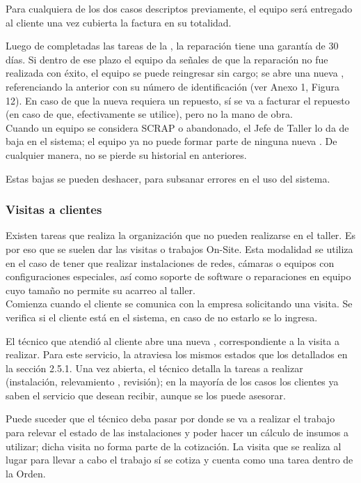 \documentclass[12pt]{extarticle}
\begin{document}
\begin{spacing}{1.2}
    Para cualquiera de los dos casos descriptos previamente, el equipo será entregado al cliente una vez cubierta la factura en su totalidad.

    Luego de completadas las tareas de la \OT{}, la reparación tiene una garantía de 30 días. Si dentro de ese plazo el equipo da señales de que la reparación no fue realizada con éxito, el equipo se puede reingresar sin cargo; se abre una nueva \OT{}, referenciando la \OT{} anterior con su número de identificación (ver Anexo 1, Figura 12). En caso de que la nueva \OT{} requiera un repuesto, sí se va a facturar el repuesto (en caso de que, efectivamente se utilice), pero no la mano de obra. \\
    
    Cuando un equipo se considera SCRAP o abandonado, el Jefe de Taller lo da de baja en el sistema; el equipo ya no puede formar parte de ninguna nueva \OT{}. De cualquier manera, no se pierde su historial en \OTs{} anteriores.

    Estas bajas se pueden deshacer, para subsanar errores en el uso del sistema.

    \subsubsection{Visitas a clientes}

    Existen tareas que realiza la organización que no pueden realizarse en el taller. Es por eso que se suelen dar las visitas o trabajos On-Site. Esta modalidad se utiliza en el caso de tener que realizar instalaciones de redes, cámaras o equipos con configuraciones especiales, así como soporte de software o reparaciones en equipo cuyo tamaño no permite su acarreo al taller.\\

    Comienza cuando el cliente se comunica con la empresa solicitando una visita. Se verifica si el cliente está en el sistema, en caso de no estarlo se lo ingresa.

    El técnico que atendió al cliente abre una nueva \OT{}, correspondiente a la visita a realizar. Para este servicio, la \OT{} atraviesa los mismos estados que los detallados en la sección 2.5.1.
    Una vez abierta, el técnico detalla la tareas a realizar (instalación, relevamiento , revisión); en la mayoría de los casos los clientes ya saben el servicio que desean recibir, aunque se los puede asesorar.

    Puede suceder que el técnico deba pasar por donde se va a realizar el trabajo para relevar el estado de las instalaciones y poder hacer un cálculo de insumos a utilizar; dicha visita no forma parte de la cotización. La visita que se realiza al lugar para llevar a cabo el trabajo sí se cotiza y cuenta como una tarea dentro de la Orden.\\


\end{spacing}
\end{document}

